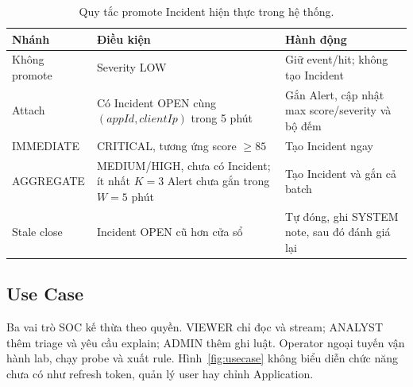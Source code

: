 \documentclass[runningheads]{report-template/llncs}
\begin{document}
\begin{table}
\caption{Quy tắc promote Incident hiện thực trong hệ thống.}
\label{tab:promotion}
\centering\small
\begin{tabularx}{\textwidth}{@{}p{24mm}p{43mm}Y@{}}
\toprule
Nhánh & Điều kiện & Hành động\\
\midrule
Không promote & Severity LOW & Giữ event/hit; không tạo Incident\\
Attach & Có Incident OPEN cùng \((appId,clientIp)\) trong 5 phút &
Gắn Alert, cập nhật max score/severity và bộ đếm\\
IMMEDIATE & CRITICAL, tương ứng score \(\geq85\) & Tạo Incident ngay\\
AGGREGATE & MEDIUM/HIGH, chưa có Incident; ít nhất \(K=3\) Alert chưa
gắn trong \(W=5\) phút & Tạo Incident và gắn cả batch\\
Stale close & Incident OPEN cũ hơn cửa sổ & Tự đóng, ghi SYSTEM note,
sau đó đánh giá lại\\
\bottomrule
\end{tabularx}
\end{table}

\subsection{Use Case}

Ba vai trò SOC kế thừa theo quyền. VIEWER chỉ đọc và stream;
ANALYST thêm triage và yêu cầu explain; ADMIN thêm ghi luật. Operator
ngoại tuyến vận hành lab, chạy probe và xuất rule. Hình~\ref{fig:usecase}
không biểu diễn chức năng chưa có như refresh token, quản lý user hay
chỉnh Application.
\end{document}

